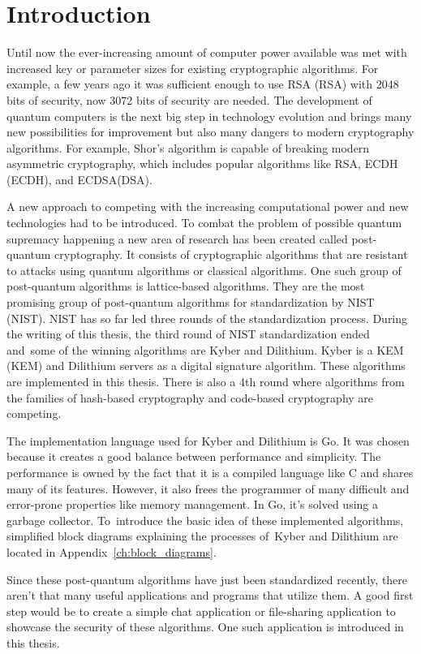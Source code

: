 \chapter*{Introduction}
{}

Until now the ever-increasing amount of computer power available was met with increased key or parameter sizes for existing cryptographic algorithms. For example, a few years ago it was sufficient enough to use RSA (\acl{RSA}) with 2048 bits of security, now 3072 bits of security are needed. The development of quantum computers is the next big step in technology evolution and brings many new possibilities for improvement but also many dangers to modern cryptography algorithms. For example, Shor's algorithm is capable of breaking modern asymmetric cryptography, which includes popular algorithms like RSA, ECDH (\acl{ECDH}), and ECDSA(\acl{DSA}).

A new approach to competing with the increasing computational power and new technologies had to be introduced. To combat the problem of possible quantum supremacy happening a new area of research has been created called post-quantum cryptography. It consists of cryptographic algorithms that are resistant to attacks using quantum algorithms or classical algorithms. One such group of post-quantum algorithms is lattice-based algorithms. They are the most promising group of post-quantum algorithms for standardization by NIST (\acl{NIST}). NIST has so far led three rounds of the standardization process. During the writing of this thesis, the third round of NIST standardization ended and~some of the winning algorithms are Kyber and Dilithium. Kyber is a KEM (\acl{KEM}) and Dilithium servers as a digital signature algorithm. These algorithms are implemented in this thesis. There is also a 4th round where algorithms from the families of hash-based cryptography and code-based cryptography are competing.

The implementation language used for Kyber and Dilithium is Go. It was chosen because it creates a good balance between performance and simplicity. The performance is owned by the fact that it is a compiled language like C and shares many of its features. However, it also frees the programmer of many difficult and error-prone properties like memory management. In Go, it's solved using a garbage collector. To~introduce the basic idea of these implemented algorithms, simplified block diagrams explaining the processes of~Kyber and Dilithium are located in Appendix~\ref{ch:block_diagrams}.

Since these post-quantum algorithms have just been standardized recently, there aren't that many useful applications and programs that utilize them. A good first step would be to create a simple chat application or file-sharing application to showcase the security of these algorithms. One such application is introduced in this thesis.
